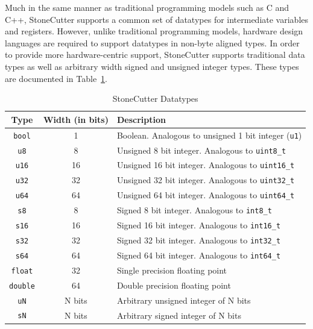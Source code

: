 \documentclass{article}
\begin{document}
Much in the same manner as traditional programming models such as C and C++, StoneCutter 
supports a common set of datatypes for intermediate variables and registers.  However, unlike 
traditional programming models, hardware design languages are required to support datatypes 
in non-byte aligned types.  In order to provide more hardware-centric support, StoneCutter supports 
traditional data types as well as arbitrary width signed and unsigned integer types.  These types are 
documented in Table~\ref{tab:datatypes}. 

\begin{table}[h]
\begin{center}
\caption{StoneCutter Datatypes}
\vspace{0.125in}
\label{tab:datatypes}
\begin{tabular}{|c|c|l|}
\hline
\textbf{Type} & \textbf{Width (in bits)} & \textbf{Description}\\
\hline
\texttt{bool} & 1 & Boolean.  Analogous to unsigned 1 bit integer (\texttt{u1})\\
\hline
\texttt{u8} & 8 & Unsigned 8 bit integer. Analogous to \texttt{uint8\_t}\\
\hline
\texttt{u16} & 16 & Unsigned 16 bit integer. Analogous to \texttt{uint16\_t}\\
\hline
\texttt{u32} & 32 & Unsigned 32 bit integer. Analogous to \texttt{uint32\_t}\\
\hline
\texttt{u64} & 64 & Unsigned 64 bit integer. Analogous to \texttt{uint64\_t}\\
\hline
\texttt{s8} & 8 & Signed 8 bit integer. Analogous to \texttt{int8\_t}\\
\hline
\texttt{s16} & 16 & Signed 16 bit integer. Analogous to \texttt{int16\_t}\\
\hline
\texttt{s32} & 32 & Signed 32 bit integer. Analogous to \texttt{int32\_t}\\
\hline
\texttt{s64} & 64 & Signed 64 bit integer. Analogous to \texttt{int64\_t}\\
\hline
\texttt{float} & 32 & Single precision floating point\\
\hline
\texttt{double} & 64 & Double precision floating point\\
\hline
\texttt{uN} & N bits & Arbitrary unsigned integer of N bits\\
\hline
\texttt{sN} & N bits & Arbitrary signed integer of N bits\\
\hline
\end{tabular}
\end{center}
\end{table}
\end{document}
